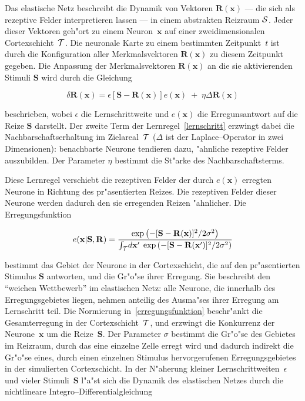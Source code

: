 Das elastische Netz beschreibt die Dynamik von Vektoren $\mathbf{R(x)}$ ---
die sich als rezeptive Felder interpretieren lassen --- in einem abstrakten
Reizraum $\cal S$.  Jeder dieser Vektoren geh"ort zu einem
Neuron~$\mathbf{x}$ auf einer zweidimensionalen Cortexschicht~$\cal T$.
Die neuronale Karte zu einem bestimmten Zeitpunkt~$t$ ist durch die
Konfiguration aller Merkmalsvektoren $\mathbf{R(x)}$ zu diesem Zeitpunkt
gegeben.  Die Anpassung der Merkmalsvektoren $\mathbf{R(x)}$ an die sie
aktivierenden Stimuli $\mathbf{S}$ wird durch die Gleichung

\begin{equation}
\delta\mathbf{R(x)}=\epsilon\left[\mathbf{S-R(x)}\right]
e(\mathbf{x})\;+\;\eta\Delta \mathbf{R(x)}
\label{lernschritt}
\end{equation}

beschrieben, wobei $\epsilon$ die Lernschrittweite und $e(\mathbf{x})$ die
Erregunsantwort auf die Reize $\mathbf{S}$ darstellt.  Der zweite Term der
Lernregel~\eqref{lernschritt} erzwingt dabei die Nachbarschaftserhaltung im
Zielareal~$\cal T$ ($\Delta$ ist der Laplace--Operator in zwei
Dimensionen): benachbarte Neurone tendieren dazu, "ahnliche rezeptive
Felder auszubilden. Der Parameter $\eta$ bestimmt die St"arke des
Nachbarschaftsterms.

Diese Lernregel verschiebt die rezeptiven Felder der durch $e(\mathbf{x})$
erregten Neurone in Richtung des pr"asentierten Reizes. Die rezeptiven
Felder dieser Neurone werden dadurch den sie erregenden Reizen "ahnlicher.
Die Erregungsfunktion

\begin{equation}
e(\mathbf{x|S,R})=\frac{\exp\left(-[\mathbf{S-R(x)}]^2/2\sigma^2\right)}
{\int_{\cal
T}\!d\mathbf{x}^\prime\;\exp\left(-[\mathbf{S-R(\mathbf{x}^\prime)}]^2/2
\sigma^2\right)}
\label{erregungsfunktion}
\end{equation}

\noindent bestimmt das Gebiet der Neurone in der Cortexschicht, die auf den
pr"asentierten Stimulus $\mathbf{S}$ antworten, und die Gr"o"se ihrer
Erregung.  Sie beschreibt den ``weichen Wettbewerb'' im elastischen Netz:
alle Neurone, die innerhalb des Erregungsgebietes liegen, nehmen anteilig
des Ausma"ses ihrer Erregung am Lernschritt teil.  Die Normierung
in~\eqref{erregungsfunktion} beschr"ankt die Gesamterregung in der
Cortexschicht~$\cal T$, und erzwingt die Konkurrenz der
Neurone~$\mathbf{x}$ um die Reize~$\mathbf{S}$.  Der Parameter $\sigma$
bestimmt die Gr"o"se des Gebietes im Reizraum, durch das eine einzelne
Zelle erregt wird und dadurch indirekt die Gr"o"se eines, durch einen
einzelnen Stimulus hervorgerufenen Erregungsgebietes in der simulierten
Cortexschicht.  In der N"aherung kleiner Lernschrittweiten~$\epsilon$ und
vieler Stimuli~$\mathbf{S}$ l"a"st sich die Dynamik des elastischen Netzes
durch die nichtlineare Integro--Differentialgleichung

